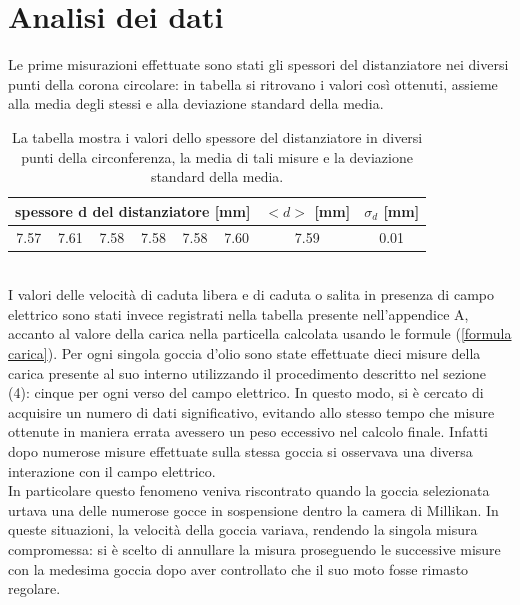 \documentclass{article}
\begin{document}
\section{Analisi dei dati}

Le prime misurazioni effettuate sono stati gli spessori del distanziatore nei diversi punti della corona circolare: in tabella si ritrovano i valori così ottenuti, assieme alla media degli stessi e alla deviazione standard della media. \\
\begin{table}[h!]
    \centering
    \begin{tabular}{|c|c|c|c|c|c||c||c|}
    \hline
    \multicolumn{6}{|c||}{spessore d del distanziatore  [mm]} & $<d>$ [mm] & $\sigma_d$ [mm]\\
    \hline
        7.57 & 7.61 & 7.58 & 7.58 & 7.58 & 7.60 & %
        7.59 & %
        0.01 \\
        \hline


    
    \end{tabular}
    \label{misure d}
    \caption{La tabella mostra i valori dello spessore del distanziatore in diversi punti della circonferenza, la media di tali misure e la deviazione standard della media. }
    \label{tab:my_label}
\end{table} \\
I valori delle velocità di caduta libera e di caduta o salita in presenza di campo elettrico sono stati invece registrati nella tabella presente nell'appendice A, accanto al valore della carica nella particella calcolata usando le formule (\ref{formula carica}).
Per ogni singola goccia d'olio sono state effettuate dieci misure della carica presente al suo interno utilizzando il procedimento descritto nel sezione (4): cinque per ogni verso del campo elettrico. In questo modo, si è cercato di acquisire un numero di dati significativo, evitando allo stesso tempo che misure ottenute in maniera errata avessero un peso eccessivo nel calcolo finale. Infatti dopo numerose misure effettuate sulla stessa goccia si osservava una diversa interazione con il campo elettrico.\\ In particolare questo fenomeno veniva riscontrato quando la goccia selezionata urtava una delle numerose gocce in sospensione dentro la camera di Millikan. In queste situazioni, la velocità della goccia variava, rendendo la singola misura compromessa: si è scelto di annullare la misura proseguendo le successive misure con la medesima goccia dopo aver controllato che il suo moto fosse rimasto regolare.
\end{document}
